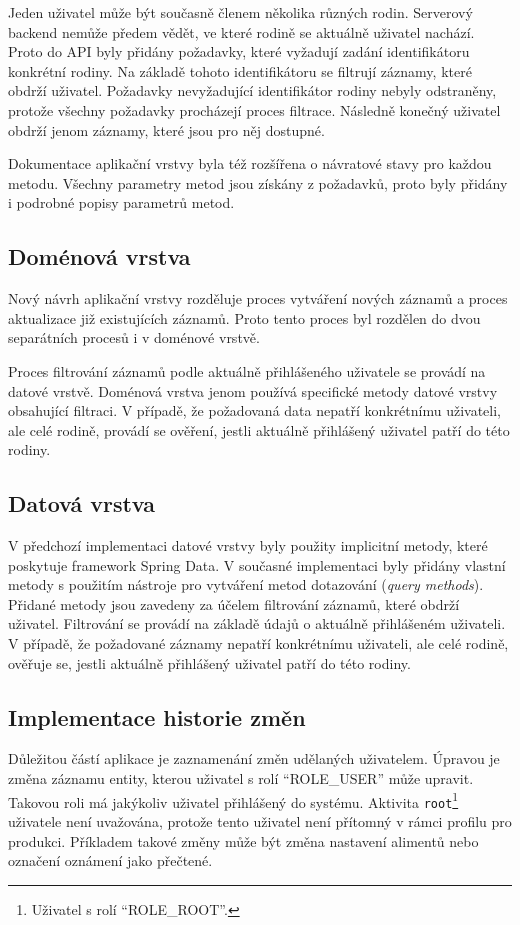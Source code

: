         
        Jeden uživatel může být současně členem několika různých rodin. Serverový backend nemůže předem vědět, ve které rodině se aktuálně uživatel nachází. Proto do API byly přidány požadavky, které vyžadují zadání identifikátoru konkrétní rodiny. Na základě tohoto identifikátoru se filtrují záznamy, které obdrží uživatel. Požadavky nevyžadující identifikátor rodiny nebyly odstraněny, protože všechny požadavky procházejí proces filtrace. Následně konečný uživatel obdrží jenom záznamy, které jsou pro něj dostupné.
        
        
        Dokumentace aplikační vrstvy byla též rozšířena o návratové stavy pro každou metodu. Všechny parametry metod jsou získány z požadavků, proto byly přidány i podrobné popisy parametrů metod. 
        
    \subsection{Doménová vrstva}%
        Nový návrh aplikační vrstvy rozděluje proces vytváření nových záznamů a proces aktualizace již existujících záznamů. Proto tento proces byl rozdělen do dvou separátních procesů i v doménové vrstvě.
        
        
        Proces filtrování záznamů podle aktuálně přihlášeného uživatele se provádí na datové vrstvě. Doménová vrstva jenom používá specifické metody datové vrstvy obsahující filtraci. V případě, že požadovaná data nepatří konkrétnímu uživateli, ale celé rodině, provádí se ověření, jestli aktuálně přihlášený uživatel patří do této rodiny.
        
    \subsection{Datová vrstva}
        V předchozí implementaci datové vrstvy byly použity implicitní metody, které poskytuje framework Spring Data. V současné implementaci byly přidány vlastní metody s použitím nástroje pro vytváření metod dotazování (\textit{query methods}). Přidané metody jsou zavedeny za účelem filtrování záznamů, které obdrží uživatel. Filtrování se provádí na základě údajů o aktuálně přihlášeném uživateli.
        V případě, že požadované záznamy nepatří konkrétnímu uživateli, ale celé rodině, ověřuje se, jestli aktuálně přihlášený uživatel patří do této rodiny.
    
    \subsection{Implementace historie změn}
        Důležitou částí aplikace je zaznamenání změn udělaných uživatelem. Úpravou je změna záznamu entity, kterou uživatel s rolí \enquote{ROLE\_USER} může upravit. Takovou roli má jakýkoliv uživatel přihlášený do systému. Aktivita \texttt{root}\footnote{Uživatel s rolí \enquote{ROLE\_ROOT}.} uživatele není uvažována, protože tento uživatel není přítomný v rámci profilu pro produkci. Příkladem takové změny může být změna nastavení alimentů nebo označení oznámení jako přečtené.
    
